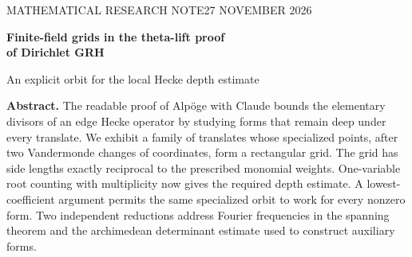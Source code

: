 \documentclass[11pt,letterpaper]{article}
\begin{document}
\thispagestyle{plain}
{\sffamily\small\color{accent} MATHEMATICAL RESEARCH NOTE\hfill 27 NOVEMBER 2026}\par
\vspace{7pt}
{\sffamily\bfseries\color{ink}\LARGE Finite-field grids in the theta-lift proof\\[3pt] of Dirichlet GRH}\par
\vspace{3pt}
{\large An explicit orbit for the local Hecke depth estimate}\par
\vspace{5pt}
\textbf{Abstract.} The readable proof of Alpöge with Claude bounds the elementary divisors of an edge Hecke operator by studying forms that remain deep under every translate. We exhibit a family of translates whose specialized points, after two Vandermonde changes of coordinates, form a rectangular grid. The grid has side lengths exactly reciprocal to the prescribed monomial weights. One-variable root counting with multiplicity now gives the required depth estimate. A lowest-coefficient argument permits the same specialized orbit to work for every nonzero form. Two independent reductions address Fourier frequencies in the spanning theorem and the archimedean determinant estimate used to construct auxiliary forms.
\end{document}
